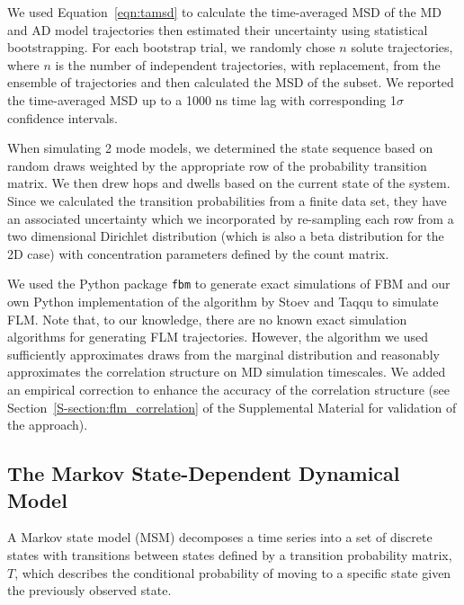 \documentclass[aps,pre,preprint,groupedaddress,longbibliography]{revtex4-2}
\begin{document}
  We used Equation~\ref{eqn:tamsd} to calculate the time-averaged MSD of the MD
  and AD model trajectories then estimated their uncertainty using statistical 
  bootstrapping. For each bootstrap trial, we randomly chose $n$ solute trajectories,
  where $n$ is the number of independent trajectories, with replacement, from the 
  ensemble of trajectories and then calculated the MSD of the subset. We reported 
  the time-averaged MSD up to a 1000 ns time lag with corresponding 1$\sigma$ confidence
  intervals. 

  When simulating 2 mode models, we determined the state sequence based on random 
  draws weighted by the appropriate row of the probability transition matrix. We then
  drew hops and dwells based on the current state of the system. Since we calculated
  the transition probabilities from a finite data set, they have an associated 
  uncertainty which we incorporated by re-sampling each row from a two dimensional
  Dirichlet distribution (which is also a beta distribution for the 2D case) with 
  concentration parameters defined by the count matrix.~\cite{bacallado_bayesian_2009}
  
  We used the Python package \texttt{fbm} to generate exact simulations of FBM and our
  own Python implementation of the algorithm by Stoev and Taqqu to simulate FLM.
  \cite{stoev_simulation_2004} Note that, to our knowledge, there are no known exact
  simulation algorithms for generating FLM trajectories. However, the algorithm
  we used sufficiently approximates draws from the marginal distribution and 
  reasonably approximates the correlation structure on MD simulation timescales. We
  added an empirical correction to enhance the accuracy of the correlation structure
  (see Section~\ref{S-section:flm_correlation} of the Supplemental Material for 
  validation of the approach).

  \subsection{The Markov State-Dependent Dynamical Model}\label{method:MSMs}  

  A Markov state model (MSM) decomposes a time series into a set of discrete states
  with transitions between states defined by a transition probability matrix, $T$,
  which describes the conditional probability of moving to a specific state given
  the previously observed state.~\cite{pande_everything_2010,wehmeyer_introduction_2018}
\end{document}
